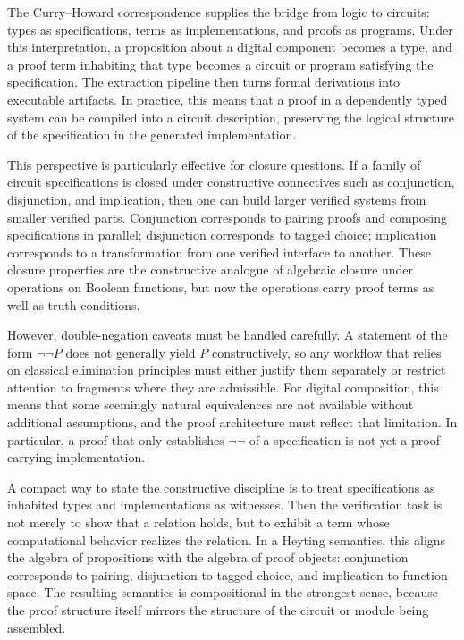 \documentclass[11pt]{article}
\begin{document}
The Curry--Howard correspondence supplies the bridge from logic to circuits: types as specifications, terms as implementations, and proofs as programs. Under this interpretation, a proposition about a digital component becomes a type, and a proof term inhabiting that type becomes a circuit or program satisfying the specification. The extraction pipeline then turns formal derivations into executable artifacts. In practice, this means that a proof in a dependently typed system can be compiled into a circuit description, preserving the logical structure of the specification in the generated implementation.

This perspective is particularly effective for closure questions. If a family of circuit specifications is closed under constructive connectives such as conjunction, disjunction, and implication, then one can build larger verified systems from smaller verified parts. Conjunction corresponds to pairing proofs and composing specifications in parallel; disjunction corresponds to tagged choice; implication corresponds to a transformation from one verified interface to another. These closure properties are the constructive analogue of algebraic closure under operations on Boolean functions, but now the operations carry proof terms as well as truth conditions.

However, double-negation caveats must be handled carefully. A statement of the form \(\neg\neg P\) does not generally yield \(P\) constructively, so any workflow that relies on classical elimination principles must either justify them separately or restrict attention to fragments where they are admissible. For digital composition, this means that some seemingly natural equivalences are not available without additional assumptions, and the proof architecture must reflect that limitation. In particular, a proof that only establishes \(\neg\neg\) of a specification is not yet a proof-carrying implementation.

A compact way to state the constructive discipline is to treat specifications as inhabited types and implementations as witnesses. Then the verification task is not merely to show that a relation holds, but to exhibit a term whose computational behavior realizes the relation. In a Heyting semantics, this aligns the algebra of propositions with the algebra of proof objects: conjunction corresponds to pairing, disjunction to tagged choice, and implication to function space. The resulting semantics is compositional in the strongest sense, because the proof structure itself mirrors the structure of the circuit or module being assembled.
\end{document}
